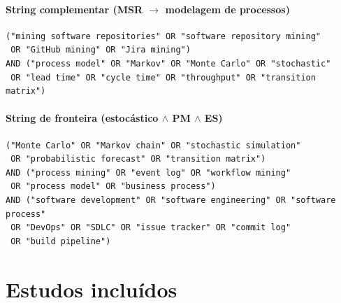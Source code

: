 \documentclass[preprint,12pt,authoryear=false]{elsarticle}
\begin{document}
\paragraph{String complementar (MSR $\rightarrow$ modelagem de processos)}
\begin{footnotesize}\begin{verbatim}
("mining software repositories" OR "software repository mining"
 OR "GitHub mining" OR "Jira mining")
AND ("process model" OR "Markov" OR "Monte Carlo" OR "stochastic"
 OR "lead time" OR "cycle time" OR "throughput" OR "transition matrix")
\end{verbatim}\end{footnotesize}

\paragraph{String de fronteira (estocástico $\wedge$ PM $\wedge$ ES)}
\begin{footnotesize}\begin{verbatim}
("Monte Carlo" OR "Markov chain" OR "stochastic simulation"
 OR "probabilistic forecast" OR "transition matrix")
AND ("process mining" OR "event log" OR "workflow mining"
 OR "process model" OR "business process")
AND ("software development" OR "software engineering" OR "software process"
 OR "DevOps" OR "SDLC" OR "issue tracker" OR "commit log"
 OR "build pipeline")
\end{verbatim}\end{footnotesize}

\section{Estudos incluídos}\label{app:studies}




\end{document}
